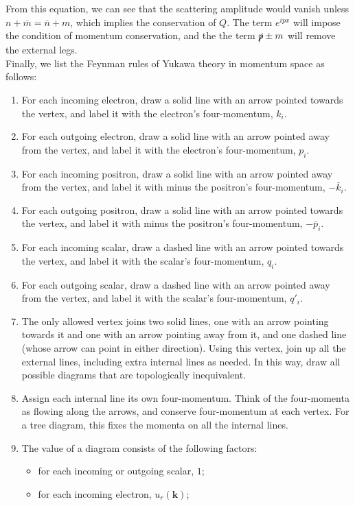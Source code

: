 \noindent
From this equation, we can see that the scattering amplitude would vanish unless $n+\overline{m} = \overline{n} + m$, which implies the conservation of $Q$. The term $e^{ipx}$ will impose the condition of momentum conservation, and the the term $\slashed{p}\pm m$ will remove the external legs.
\\
Finally, we list the Feynman rules of Yukawa theory in momentum space as follows:
\begin{enumerate}
\item For each incoming electron, draw a solid line with an arrow pointed towards the vertex, and label it with the electron's four-momentum, $k_i$.
\item For each outgoing electron, draw a solid line with an arrow pointed away from the vertex, and label it with the electron's four-momentum, $p_i$.
\item For each incoming positron, draw a solid line with an arrow pointed away from the vertex, and label it with minus the positron's four-momentum, $-\bar{k}_i$.
\item For each outgoing positron, draw a solid line with an arrow pointed towards the vertex, and label it with minus the positron's four-momentum, $-\bar{p}_i$.
\item For each incoming scalar, draw a dashed line with an arrow pointed towards the vertex, and label it with the scalar's four-momentum, $q_i$.
\item For each outgoing scalar, draw a dashed line with an arrow pointed away from the vertex, and label it with the scalar's four-momentum, $q'_i$.
\item The only allowed vertex joins two solid lines, one with an arrow pointing towards it and one with an arrow pointing away from it, and one dashed line (whose arrow can point in either direction). Using this vertex, join up all the external lines, including extra internal lines as needed. In this way, draw all possible diagrams that are topologically inequivalent.
\item Assign each internal line its own four-momentum. Think of the four-momenta as flowing along the arrows, and conserve four-momentum at each vertex. For a tree diagram, this fixes the momenta on all the internal lines.
\item The value of a diagram consists of the following factors:
\begin{itemize}
\item for each incoming or outgoing scalar, $1$;
\item for each incoming electron, $u_{r}(\bm{k})$;

\end{itemize}
\end{enumerate}
